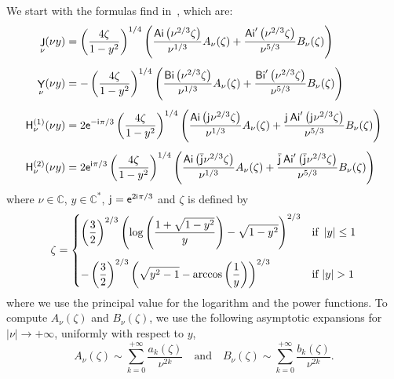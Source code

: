 \documentclass[12pt,a4paper]{article}
\numberwithin{equation}{section}
\newcommand{\bbC}{\mathbb{C}}
\newcommand{\ex}{\mathsf{e}}
\newcommand{\im}{\mathsf{i}\mkern1mu}
\newcommand{\jc}{\mathsf{j}\mkern1mu}
\DeclareMathOperator{\Ai}{\mathsf{Ai}}
\DeclareMathOperator{\Bi}{\mathsf{Bi}}
\DeclareMathOperator{\bJ}{\mathsf{J}}
\DeclareMathOperator{\bY}{\mathsf{Y}}
\newcommand{\hO}{\mathop{}\!\mathsf{H}^{(1)}}
\newcommand{\hT}{\mathop{}\!\mathsf{H}^{(2)}}
\newcommand{\abs}[1]{\left\lvert#1\right\rvert}
\newcommand{\plr}[1]{\left(#1\right)}
\theoremstyle{definition}
\theoremstyle{plain}
\theoremstyle{remark}
\begin{document}
We start with the formulas find in~\cite{Olv97}, which are:
\begin{subequations}\label{expansion}
    \begin{align}
        \bJ_\nu(\nu y)
         & = \plr{\frac{4 \zeta}{1-y^2}}^{1/4} \plr{
            \frac{\Ai\plr{\nu^{2/3} \zeta}}{\nu^{1/3}} A_\nu(\zeta)
            + \frac{\Ai'\plr{\nu^{2/3} \zeta}}{\nu^{5/3}} B_\nu(\zeta)
        }
        \\[1ex]
        \bY_\nu(\nu y)
         & = -\plr{\frac{4 \zeta}{1-y^2}}^{1/4} \plr{
            \frac{\Bi\plr{\nu^{2/3} \zeta}}{\nu^{1/3}} A_\nu(\zeta)
            + \frac{\Bi'\plr{\nu^{2/3} \zeta}}{\nu^{5/3}} B_\nu(\zeta)
        }
        \\[1ex]
        \hO_\nu(\nu y)
         & = 2 \ex^{-\im \pi/3} \plr{\frac{4 \zeta}{1-y^2}}^{1/4} \plr{
            \frac{\Ai\plr{\jc \nu^{2/3} \zeta}}{\nu^{1/3}} A_\nu(\zeta)
            + \frac{\jc \Ai'\plr{\jc \nu^{2/3} \zeta}}{\nu^{5/3}} B_\nu(\zeta)
        }                                                               \\[1ex]
        \hT_\nu(\nu y)
         & = 2 \ex^{\im \pi/3} \plr{\frac{4 \zeta}{1-y^2}}^{1/4} \plr{
            \frac{\Ai\plr{\overline{\jc} \nu^{2/3} \zeta}}{\nu^{1/3}} A_\nu(\zeta)
            + \frac{\overline{\jc} \Ai'\plr{\overline{\jc} \nu^{2/3} \zeta}}{\nu^{5/3}} B_\nu(\zeta)
        }
    \end{align}
\end{subequations}
where \( \nu \in \bbC \), \( y \in \bbC^* \), \( \jc = \ex^{2 \im \pi /3} \) and \( \zeta \) is defined by
\[
    \zeta = \begin{dcases}
        \plr{\frac{3}{2}}^{2/3} \plr{
            \log\plr{\frac{1+\sqrt{1-y^2}}{y}} -\sqrt{1-y^2}
        }^{2/3}
         & \text{if } \abs{y} \leq 1
        \\[1ex]
        -\plr{\frac{3}{2}}^{2/3} \plr{
            \sqrt{y^2-1} - \arccos\plr{\frac{1}{y}}
        }^{2/3}
         & \text{if } |y| > 1
    \end{dcases}
\]
where we use the principal value for the logarithm and the power functions.
To compute \( A_\nu(\zeta) \) and \( B_\nu(\zeta) \), we use the following asymptotic expansions for \( \abs{\nu} \rightarrow +\infty \), uniformly with respect to \( y \),
\begin{equation}\label{AaBb}
    A_\nu(\zeta) \sim \sum_{k = 0}^{+\infty} \frac{a_k(\zeta)}{\nu^{2 k}}
    \quad \text{and} \quad
    B_\nu(\zeta) \sim \sum_{k = 0}^{+\infty} \frac{b_k(\zeta)}{\nu^{2 k}}.
\end{equation}
\end{document}
